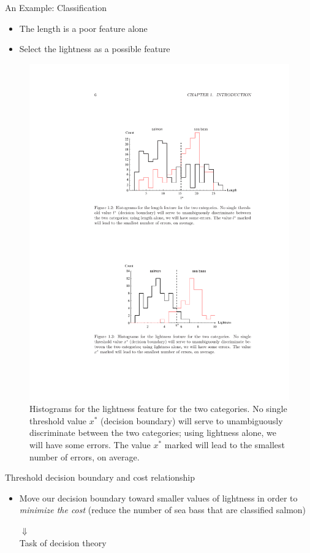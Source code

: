 \begin{frame}{An Example: Classification}
\begin{itemize}
\item The length is a poor feature alone
\item Select the lightness as a possible feature
\end{itemize}
\begin{figure}
\includegraphics[scale=0.8]{Figures/Ch0102}
\caption{Histograms for the lightness feature for the two categories. No single threshold value $x^*$ (decision boundary) will serve to unambiguously discriminate between the two categories; using lightness alone, we will have some errors. The value $x^*$  marked will lead to the smallest number of errors, on average.}
\end{figure}
\end{frame}

\begin{frame}{Threshold decision boundary and cost relationship}
\begin{itemize}
\item Move our decision boundary toward smaller values of lightness in order to \textit{\color{mycolor2}minimize the cost} (reduce the number of sea bass that are classified salmon)\\
\vspace{14pt}
\begin{center}
{\Huge $\Downarrow$}\\
\vspace{14pt}
Task of decision theory
\end{center}
\end{itemize}
\end{frame}

